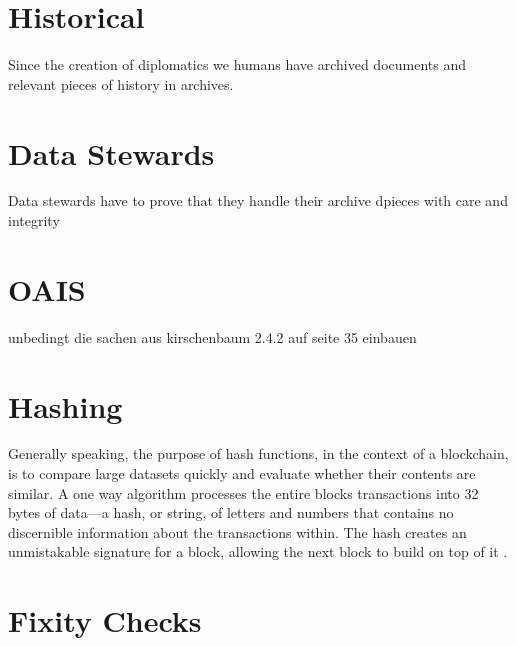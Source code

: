 \section{Historical}
Since the creation of diplomatics we humans have archived documents and relevant pieces of history in archives. 
\section{Data Stewards}
Data stewards have to prove that they handle their archive dpieces with care and integrity
\section{OAIS}
unbedingt die sachen aus kirschenbaum 2.4.2 auf seite 35 einbauen
\section{Hashing}
Generally speaking, the purpose of hash functions, in the context of a blockchain, is to compare large datasets quickly and evaluate whether their contents are similar. A one way algorithm processes the entire blocks transactions into 32 bytes of data—a hash, or string, of letters and numbers that contains no discernible information about the transactions within. The hash creates an unmistakable signature for a block, allowing the next block to build on top of it \cite[55]{dannen2017introducing}.
\section{Fixity Checks}